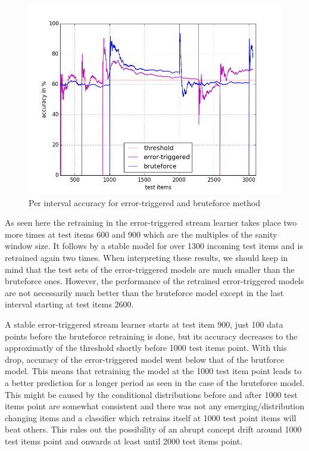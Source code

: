 \documentclass{article} %
\begin{document}
\begin{figure}[htbp]
  \centering
  \includegraphics[scale=0.5]{./plots/errortriggered_bruteforce.png}
  \caption{Per interval accuracy for error-triggered and bruteforce method}
\end{figure}

As seen here the retraining in the error-triggered stream learner takes place two more times at test items 600 and 900 which are the multiples of the sanity window size. It follows by a stable model for over 1300 incoming test items and is retrained again two times. When interpreting these results, we should keep in mind that the test sets of the error-triggered models are much smaller than the bruteforce ones. However, the performance of the retrained error-triggered models are not necessarily much better than the bruteforce model except in the last interval starting at test items 2600. 

A stable error-triggered stream learner starts at test item 900, just 100 data points before the bruteforce retraining is done, but its accuracy decreases to the approximatly of the threshold shortly before 1000 test items point. With this drop, accuracy of the error-triggered model went below that of the brutforce model. This means that retraining the model at the 1000 test item point leads to a better prediction for a longer period as seen in the case of the bruteforce model. This might be caused by the conditional distributions before and after 1000 test items point are somewhat consistent and there was not any emerging/distribution changing items and a classifier which retrains itself at 1000 test point items will beat others. This rules out the possibility of an abrupt concept drift around 1000 test items point and onwards at least until 2000 test items point.  
\end{document}
